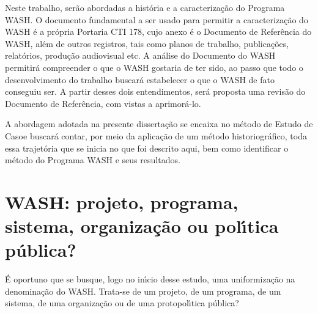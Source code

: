 \documentclass[
12pt,		%
openright,	%
twoside,  %
a4paper,			%
chapter=TITLE,		%
english,			%
french,				%
spanish,			%
brazil				%
]{USPSC-classe/USPSC}
\begin{document}
Neste trabalho, ser\~ao abordadas a hist\'oria e a caracteriza\c{c}\~ao do Programa WASH. O documento fundamental a ser usado para permitir a caracteriza\c{c}\~ao do WASH \'e a pr\'opria Portaria CTI 178, cujo anexo \'e o Documento de Refer\^encia do WASH, al\'em de outros registros, tais como planos de trabalho, publica\c{c}\~oes, relat\'orios,  produ\c{c}\~ao audiovisual etc.  A an\'alise do Documento do WASH permitir\'a compreender \textquotedbl o que o WASH gostaria de ter sido\textquotedbl , ao passo que todo o desenvolvimento do trabalho buscar\'a estabelecer \textquotedbl o que o WASH de fato conseguiu ser\textquotedbl . A partir desses dois entendimentos, ser\'a proposta uma revis\~ao do Documento de Refer\^encia, com vistas a aprimor\'a-lo.

















A abordagem adotada na presente disserta\c{c}\~ao se encaixa no m\'etodo de \textquotedbl Estudo de Caso\textquotedbl   e buscar\'a contar, por meio da aplica\c{c}\~ao de um m\'etodo historiogr\'afico, toda essa trajet\'oria que se inicia no que foi descrito aqui, bem como identificar o m\'etodo do Programa WASH e seus resultados.

















\section[WASH: projeto, programa, sistema, organiza\c{c}\~ao ou pol\'{\i}tica p\'ublica?]{WASH: projeto, programa, sistema, organiza\c{c}\~ao ou pol\'{\i}tica p\'ublica?}\label{WASH: projeto, programa, sistema, organiza\c{c}\~ao ou pol\'{\i}tica p\'ublica?}
\'E oportuno que se busque, logo no in\'{\i}cio desse estudo, uma uniformiza\c{c}\~ao na denomina\c{c}\~ao do WASH. Trata-se de um projeto, de um programa, de um sistema, de uma organiza\c{c}\~ao ou de uma protopol\'{\i}tica p\'ublica?
\end{document}

